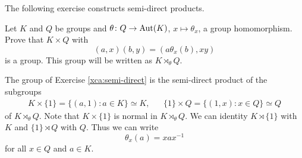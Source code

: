 





The following exercise constructs semi-direct products. 

\begin{exercise}
\label{xca:semi-direct}
Let $K$ and $Q$ be groups and $\theta\colon Q\to\operatorname{Aut}(K)$, $x\mapsto\theta_x$, a group
homomorphism. Prove that $K\times Q$ 
with 
\[
(a,x)(b,y)=(a\theta_x(b),xy)
\]
is a group. This group will be written as $K\rtimes_\theta Q$.
\end{exercise}


The group of Exercise \ref{xca:semi-direct} is the
semi-direct product of the subgroups 
\begin{align*}
K\times\{1\}=\{(a,1):a\in K\}\simeq K,&&
\{1\}\times Q=\{(1,x):x\in Q\}\simeq Q
\end{align*}
of $K\rtimes_\theta Q$. Note that $K\times\{1\}$ is normal in $K\rtimes_\theta Q$. 
We can identity $K\rtimes\{1\}$ with $K$ 
and $\{1\}\rtimes Q$ with $Q$. Thus we can write 
\[
\theta_x(a)=xax^{-1}
\]
for all $x\in Q$ and $a\in K$.


